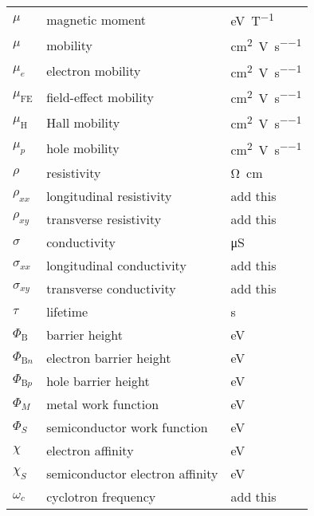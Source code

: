 \begin{longtable}[l]{p{125pt} p{150pt} p{150pt}}
	$\mu$ & magnetic moment & \si{\electronvolt\per\tesla}\\
	$\mu$ & mobility & \si{\cm\squared\per\volt\per\second}\\
	$\mu_e$ & electron mobility & \si{\cm\squared\per\volt\per\second}\\
	$\mu_\mathrm{FE}$ & field-effect mobility & \si{\cm\squared\per\volt\per\second}\\
	$\mu_\mathrm{H}$ & Hall mobility & \si{\cm\squared\per\volt\per\second}\\
	$\mu_p$ & hole mobility & \si{\cm\squared\per\volt\per\second}\\
	$\rho$ & resistivity & \si{\ohm\cm}\\
	$\rho_{xx}$ & longitudinal resistivity & add this\\
	$\rho_{xy}$ & transverse resistivity & add this\\
	$\sigma$ & conductivity & \si{\micro\siemens} \\
	$\sigma_{xx}$ & longitudinal conductivity & add this\\
	$\sigma_{xy}$ & transverse conductivity & add this\\
	$\tau$ & lifetime & \si{\second}\\
	$\Phi_\mathrm{B}$ & barrier height & \si{\electronvolt}\\
	$\Phi_{\mathrm{B}n}$ & electron barrier height & \si{\electronvolt}\\
	$\Phi_{\mathrm{B}p}$ & hole barrier height & \si{\electronvolt}\\
	$\Phi_M$ & metal work function & \si{\electronvolt}\\
	$\Phi_S$ & semiconductor work function & \si{\electronvolt}\\
	$\chi$ & electron affinity & \si{\electronvolt}\\
	$\chi_S$ & semiconductor electron affinity & \si{\electronvolt}\\
	$\omega_{c}$ & cyclotron frequency & add this\\
\bottomrule
\end{longtable}


%
